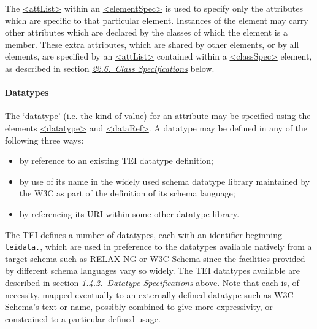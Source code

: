 \par
The \hyperref[TEI.attList]{<attList>} within an \hyperref[TEI.elementSpec]{<elementSpec>} is used to specify only the attributes which are specific to that particular element. Instances of the element may carry other attributes which are declared by the classes of which the element is a member. These extra attributes, which are shared by other elements, or by all elements, are specified by an \hyperref[TEI.attList]{<attList>} contained within a \hyperref[TEI.classSpec]{<classSpec>} element, as described in section \textit{\hyperref[TDCLA]{22.6.\ Class Specifications}} below.
\paragraph[{Datatypes}]{Datatypes}\label{TD-datatypes}\par
The ‘datatype’ (i.e. the kind of value) for an attribute may be specified using the elements \hyperref[TEI.datatype]{<datatype>} and \hyperref[TEI.dataRef]{<dataRef>}. A datatype may be defined in any of the following three ways: \begin{itemize}
\item by reference to an existing TEI datatype definition; 
\item by use of its name in the widely used schema datatype library maintained by the W3C as part of the definition of its schema language; 
\item by referencing its URI within some other datatype library.
\end{itemize} The TEI defines a number of datatypes, each with an identifier beginning \texttt{teidata.}, which are used in preference to the datatypes available natively from a target schema such as RELAX NG or W3C Schema since the facilities provided by different schema languages vary so widely. The TEI datatypes available are described in section \textit{\hyperref[DTYPES]{1.4.2.\ Datatype Specifications}} above. Note that each is, of necessity, mapped eventually to an externally defined datatype such as W3C Schema's \textsf{text} or \textsf{name}, possibly combined to give more expressivity, or constrained to a particular defined usage.\par
